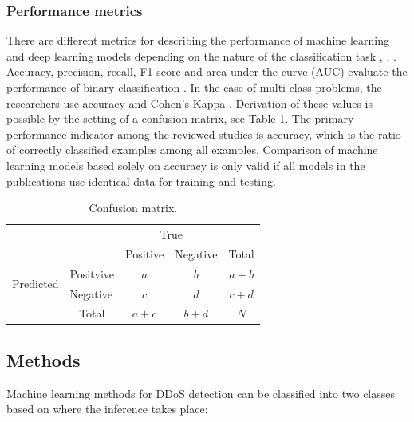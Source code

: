 \documentclass[conference, 11pt]{IEEEtran}
\begin{document}
    \subsubsection{Performance metrics}
    There are different metrics for describing the performance of machine learning and deep learning models depending on the nature of the classification task \cite{Goodfellow-et-al-2016}, \cite{sokolova2009systematic}, \cite{garcia2009study} .
    Accuracy, precision, recall, F1 score and area under the curve (AUC) evaluate the performance of binary classification \cite{sokolova2009systematic}.
    In the case of multi-class problems, the researchers use accuracy and Cohen's Kappa \cite{garcia2009study}.
    Derivation of these values is possible by the setting of a confusion matrix, see Table \ref{tab:cm}.
    The primary performance indicator among the reviewed studies is accuracy, which is the ratio of correctly classified examples among all examples.
    Comparison of machine learning models based solely on accuracy is only valid if all models in the publications use identical data for training and testing.
    \begin{table}[htbp]
        \begin{tabular}{l|l|c|c|c}
            \multicolumn{2}{c}{} & \multicolumn{2}{c}{True} & \\
            \cline{3-4}
            \multicolumn{2}{c|}{} & Positive & Negative & \multicolumn{1}{c}{Total} \\
            \cline{2-4}
            \multirow{2}{*}{Predicted} & Positvive                 & $a$                       & $b$                       & $a+b$                   \\
            \cline{2-4}
            & Negative                  & $c$                       & $d$                       & $c+d$                   \\
            \cline{2-4}
            \multicolumn{1}{c}{}       & \multicolumn{1}{c}{Total} & \multicolumn{1}{c}{$a+c$} & \multicolumn{    1}{c}{$b+d$} & \multicolumn{1}{c}{$N$}\\
        \end{tabular}
        \caption{Confusion matrix.}
        \label{tab:cm}
    \end{table}

    \subsection{Methods}
    Machine learning methods for DDoS detection can be classified into two classes based on where the inference takes place:
\end{document}
